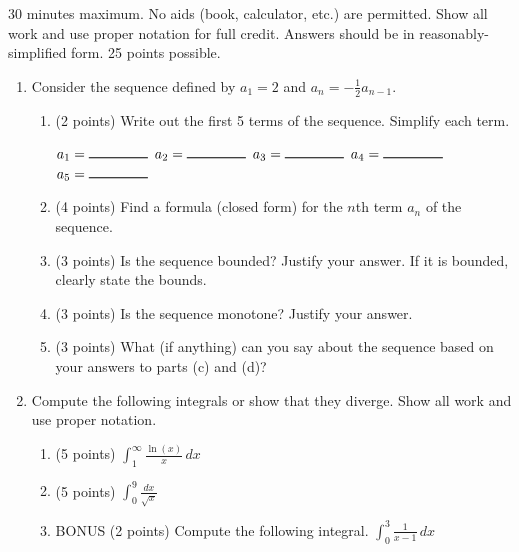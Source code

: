 \documentclass[12pt]{article}
\newcommand{\blank}[1]{\rule{#1}{0.75pt}}
\newcommand{\ds}{\displaystyle}
\begin{document}
30 minutes maximum.  No aids (book, calculator, etc.) are permitted.
Show all work and use proper notation for full credit.  Answers should
be in reasonably-simplified form.  25 points possible.

\begin{enumerate}


  \item Consider the sequence defined by $a_1 = 2$ and $\ds a_n =
    -\frac{1}{2} a_{n-1}$.
    \begin{enumerate}
    \item (2 points) Write out the first 5 terms of the sequence. Simplify each
      term.
      \vfill

      $a_1 = \blank{1.5cm}$ \hfill $a_2 = \blank{1.5cm}$ \hfill $a_3 = \blank{1.5cm}$
      \hfill $a_4 = \blank{1.5cm}$ \hfill $a_5 = \blank{1.5cm}$
      \vspace{0.7cm}

    \item (4 points) Find a formula (closed form) for the $n$th term $a_n$ of
      the sequence.
      \vfill

    \item (3 points) Is the sequence bounded? Justify your answer. If it is
      bounded, clearly state the bounds.
      \vfill

    \item (3 points) Is the sequence monotone? Justify your answer.
      \vfill

    \item (3 points) What (if anything) can you say about the sequence
      based on your answers to
      parts (c) and (d)?
      \vfill
      
    \end{enumerate}

    \newpage

  \item Compute the following integrals or show that they
    diverge. Show all work and use proper notation.
    \begin{enumerate}
    \item (5 points) $\ds \int_1^{\infty} \frac{\ln(x)}{x} \, dx$
      \vfill
      
    \item (5 points) $\ds \int_0^9 \frac{dx}{\sqrt{x}}$
      \vfill
      

    \item BONUS (2 points) Compute the following integral. $\ds \int_0^3 \frac{1}{x-1}
    \, dx$
    \vfill

  \end{enumerate}

\end{enumerate}
\end{document}
